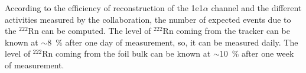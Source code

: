 \documentclass[main.tex]{subfiles}
\begin{document}
\bigskip


\noindent According to the efficiency of reconstruction of the 1e1$\alpha$ channel and the different activities measured by the collaboration, the number of expected events due to the $^{\text{222}}$Rn can be computed. The level of $^{\text{222}}$Rn coming from the tracker can be known at $\sim$8~\% after one day of measurement, so, it can be measured daily. The level of $^{\text{222}}$Rn coming from the foil bulk can be known at $\sim$10~\% after one week of measurement.
\end{document}
